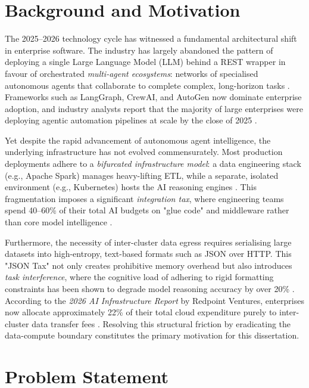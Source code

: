 \documentclass[12pt, a4paper]{report}
\begin{document}
\section{Background and Motivation}
\label{sec:background}

The 2025--2026 technology cycle has witnessed a fundamental architectural shift in
enterprise software. The industry has largely abandoned the pattern of deploying a single
Large Language Model (LLM) behind a REST wrapper in favour of orchestrated
\emph{multi-agent ecosystems}: networks of specialised autonomous agents that collaborate
to complete complex, long-horizon tasks \citep{hong2023metagpt}.
Frameworks such as LangGraph, CrewAI, and AutoGen now dominate enterprise adoption, and
industry analysts report that the majority of large enterprises were deploying agentic
automation pipelines at scale by the close of 2025 \citep{Bornstein2023,cdata2026mcp}.

Yet despite the rapid advancement of autonomous agent intelligence, the underlying infrastructure has not evolved commensurately. Most production deployments adhere to a \emph{bifurcated infrastructure model}: a data engineering stack (e.g., Apache Spark) manages heavy-lifting ETL, while a separate, isolated environment (e.g., Kubernetes) hosts the AI reasoning engines \citep{Casado2023}. This fragmentation imposes a significant \emph{integration tax}, where engineering teams spend 40--60\% of their total AI budgets on "glue code" and middleware rather than core model intelligence \citep{mckinsey2024, ItSoli2026}. 

Furthermore, the necessity of inter-cluster data egress requires serialising large datasets into high-entropy, text-based formats such as JSON over HTTP. This "JSON Tax" not only creates prohibitive memory overhead but also introduces \emph{task interference}, where the cognitive load of adhering to rigid formatting constraints has been shown to degrade model reasoning accuracy by over 20\% \citep{Tam2024, Gupta2025}. According to the \emph{2026 AI Infrastructure Report} by Redpoint Ventures, enterprises now allocate approximately 22\% of their total cloud expenditure purely to inter-cluster data transfer fees \citep{Redpoint2026}. Resolving this structural friction by eradicating the data-compute boundary constitutes the primary motivation for this dissertation.

\section{Problem Statement}
\label{sec:problem}
\end{document}
